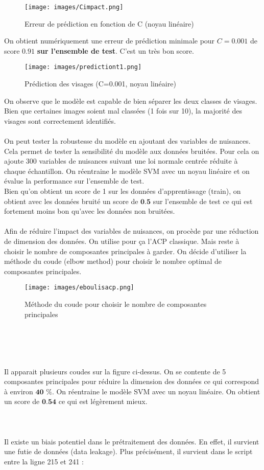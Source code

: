 \documentclass[a4paper, 12pt]{article}
\begin{document}
\begin{figure}[h]
    \centering
    \texttt{[image: images/Cimpact.png]}
    \caption{Erreur de prédiction en fonction de C (noyau linéaire)}
    \label{fig:faceC}
\end{figure}

On obtient numériquement une erreur de prédiction minimale pour $C=0.001$ de score $0.91$ \textbf{sur l'ensemble de test}. C'est un très bon score.

\begin{figure}[h]
    \centering
    \texttt{[image: images/predictiont1.png]}
    \caption{Prédiction des visages (C=0.001, noyau linéaire)}
    \label{fig:faceC2}
\end{figure}
On observe que le modèle est capable de bien séparer les deux classes de visages. Bien que certaines images soient mal classées (1 fois sur 10), la majorité des visages sont correctement identifiés.
\\
\\
On peut tester la robustesse du modèle en ajoutant des variables de nuisances. Cela permet de tester la sensibilité du modèle aux données bruitées.
Pour cela on ajoute 300 variables de nuisances suivant une loi normale centrée réduite à chaque échantillon. On réentraine le modèle SVM avec un noyau linéaire et on évalue la performance sur l'ensemble de test.
\\
Bien qu'on obtient un score de 1 sur les données d'apprentissage (train), on obtient avec les données bruité un score de $\textbf{0.5}$ sur l'ensemble de test ce qui est fortement moins bon qu'avec les données non bruitées.
\\
\\
Afin de réduire l'impact des variables de nuisances, on procède par une réduction de dimension des données. On utilise pour ça l'ACP classique. Mais reste à choisir le nombre de composantes principales à garder. On décide d'utiliser la méthode du coude (elbow method) pour choisir le nombre optimal de composantes principales.
\begin{figure}[h!]
    \centering
    \texttt{[image: images/eboulisacp.png]}
    \caption{Méthode du coude pour choisir le nombre de composantes principales}
    \label{fig:elbow}
\end{figure}
\\
\\
\\
\\
Il apparait plusieurs coudes sur la figure ci-dessus. On se contente de 5 composantes principales pour réduire la dimension des données ce qui correspond à environ $\textbf{40 \% }$.
On réentraine le modèle SVM avec un noyau linéaire. On obtient un score de $\textbf{0.54}$ ce qui est légèrement mieux.
\\
\\
\\
\\
Il existe un biais potentiel dans le prétraitement des données. En effet, il survient une futie de données (data leakage).
Plus précisément, il survient dans le script entre la ligne 215 et 241 :
\end{document}
